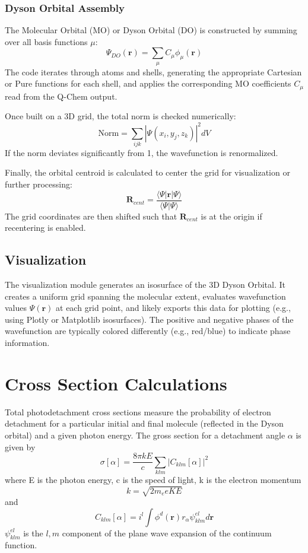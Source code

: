 \documentclass{article}
\begin{document}
\subsubsection{Dyson Orbital Assembly}
The Molecular Orbital (MO) or Dyson Orbital (DO) is constructed by summing over all basis functions $\mu$:
\begin{equation}
    \Psi_{DO}(\mathbf{r}) = \sum_{\mu} C_\mu \phi_\mu(\mathbf{r})
\end{equation}
The code iterates through atoms and shells, generating the appropriate Cartesian or Pure functions for each shell, and applies the corresponding MO coefficients $C_\mu$ read from the Q-Chem output.

Once built on a 3D grid, the total norm is checked numerically:
\begin{equation}
    \text{Norm} = \sum_{ijk} |\Psi(x_i, y_j, z_k)|^2 dV
\end{equation}
If the norm deviates significantly from 1, the wavefunction is renormalized.

Finally, the orbital centroid is calculated to center the grid for visualization or further processing:
\begin{equation}
    \mathbf{R}_{cent} = \frac{\langle \Psi | \mathbf{r} | \Psi \rangle}{\langle \Psi | \Psi \rangle}
\end{equation}
The grid coordinates are then shifted such that $\mathbf{R}_{cent}$ is at the origin if recentering is enabled.

\subsection{Visualization}
The visualization module generates an isosurface of the 3D Dyson Orbital. It creates a uniform grid spanning the molecular extent, evaluates wavefunction values $\Psi(\mathbf{r})$ at each grid point, and likely exports this data for plotting (e.g., using Plotly or Matplotlib isosurfaces). The positive and negative phases of the wavefunction are typically colored differently (e.g., red/blue) to indicate phase information.

\section{Cross Section Calculations}
Total photodetachment cross sections measure the probability of electron detachment for a particular initial and final molecule (reflected in the Dyson orbital) and a given photon energy. The gross section for a detachment angle $\alpha$ is given by
\begin{equation}
    \sigma[\alpha] = \frac{8\pi kE}{c} \sum_{klm}|C_{klm}[\alpha]|^2
\end{equation}
where E is the photon energy, c is the speed of light, k is the electron momentum
\begin{equation}
    k = \sqrt{2m_eeKE}
\end{equation}
and
\begin{equation}
    C_{klm}[\alpha] = i^l \int \phi^d(\textbf{r})r_{\alpha}\psi^{el}_{klm}d\textbf{r}
\end{equation}
$\psi^{el}_{klm}$ is the $l,m$ component of the plane wave expansion of the continuum function.
\end{document}

